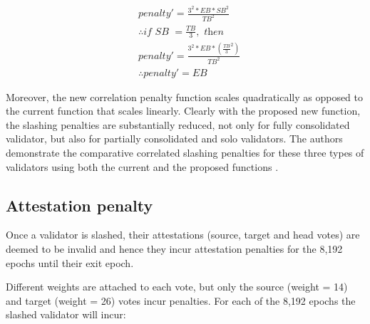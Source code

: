 \documentclass{article}
\begin{document}
\begin{equation*}
  \begin{split}
& penalty' = \frac{3^2 * EB * SB^2}{TB^2} \\
& \therefore \textit{if SB } = \frac{TB}{3}, \textit{ then} \\
& penalty' =   \frac{3^2 * EB * \left(  \frac{TB}{3}^2 \right) }{TB^2} \\
& \therefore penalty' = EB
  \end{split}
\end{equation*}

Moreover, the new correlation penalty function scales quadratically as opposed
to the current function that scales linearly. Clearly with the proposed new
function, the slashing penalties are substantially reduced, not only for fully
consolidated validator, but also for partially consolidated and solo
validators. The authors demonstrate the comparative correlated slashing
penalties for these three types of validators using both the current and the
proposed functions \cite{Neuder2023d}.

\subsection{Attestation penalty}
Once a validator is slashed, their attestations (source, target and head votes)
are deemed to be invalid and hence they incur attestation penalties for the
8,192 epochs until their exit epoch. 

Different weights are attached to each vote, but only the source (weight = 14)
and target (weight = 26) votes incur penalties. For each of the 8,192 epochs
the slashed validator will incur:
\end{document}
